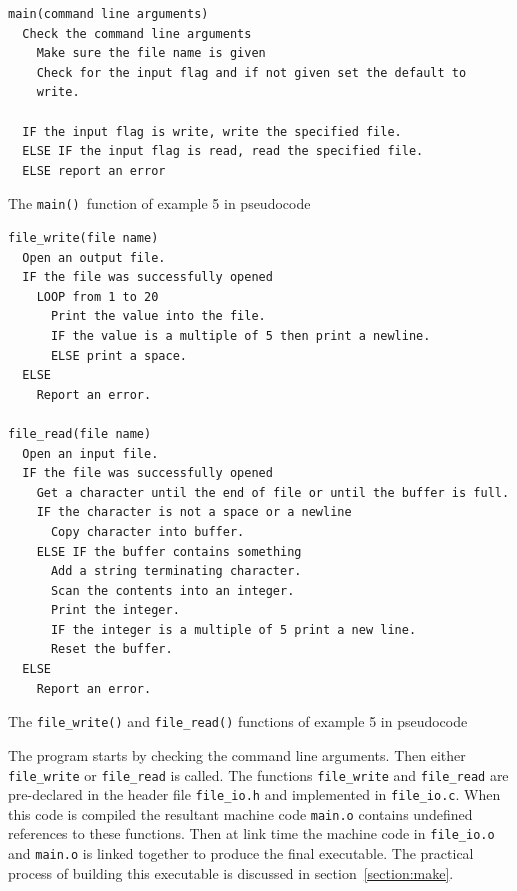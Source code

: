 \documentclass[11pt]{scrartcl}
\def\main{\texttt{main()}}
\begin{document}
\begin{pseudocode}[h]
\begin{verbatim}
main(command line arguments)
  Check the command line arguments
    Make sure the file name is given
    Check for the input flag and if not given set the default to
    write.

  IF the input flag is write, write the specified file.
  ELSE IF the input flag is read, read the specified file.
  ELSE report an error
\end{verbatim}
\caption{The \main\ function of example 5 in pseudocode \label{pseudo:ex5_main}}
\end{pseudocode}

\begin{pseudocode}[h]
\begin{verbatim}
file_write(file name)
  Open an output file.
  IF the file was successfully opened
    LOOP from 1 to 20
      Print the value into the file.
      IF the value is a multiple of 5 then print a newline.
      ELSE print a space.
  ELSE
    Report an error.

file_read(file name)
  Open an input file.
  IF the file was successfully opened
    Get a character until the end of file or until the buffer is full.
    IF the character is not a space or a newline 
      Copy character into buffer.
    ELSE IF the buffer contains something
      Add a string terminating character.
      Scan the contents into an integer.
      Print the integer.
      IF the integer is a multiple of 5 print a new line.
      Reset the buffer.
  ELSE
    Report an error.
\end{verbatim}
\caption{The \texttt{file\_write()} and \texttt{file\_read()} functions of example 5 in pseudocode \label{pseudo:ex5_fileio}}
\end{pseudocode}

The program starts by checking the command line arguments.  Then
either \texttt{file\_write} or \texttt{file\_read} is called.  The
functions \texttt{file\_write} and \texttt{file\_read} are
pre-declared in the header file \texttt{file\_io.h} and implemented in
\texttt{file\_io.c}.  When this code is compiled the resultant machine
code \texttt{main.o} contains undefined references to these
functions.  Then at link time the machine code in \texttt{file\_io.o}
and \texttt{main.o} is linked together to produce the final
executable.  The practical process of building this executable is
discussed in section~\ref{section:make}.

\clearpage
\newpage
\end{document}
